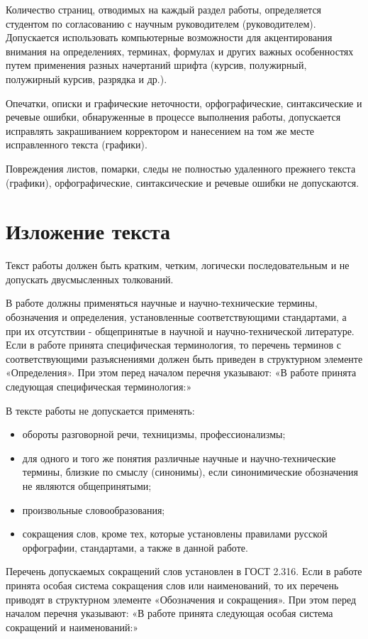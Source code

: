 \documentclass[14pt]{extreport}
\begin{document}
Количество страниц, отводимых на каждый раздел работы, определяется студентом по
согласованию с научным руководителем (руководителем). 
Допускается использовать компьютерные возможности для акцентирования внимания на
определениях, терминах, формулах и других важных особенностях путем применения
разных начертаний шрифта (курсив, полужирный, полужирный курсив, разрядка и
др.).  

Опечатки, описки и графические неточности, орфографические,
синтаксические и речевые ошибки, обнаруженные в процессе выполнения работы,
допускается исправлять закрашиванием корректором и нанесением на том же месте
исправленного текста (графики).

Повреждения листов, помарки, следы не полностью удаленного прежнего текста
(графики), орфографические, синтаксические и речевые ошибки не допускаются.

\section{Изложение текста}

Текст работы должен быть кратким, четким, логически последовательным и не
допускать двусмысленных толкований.

В работе должны применяться научные и научно-технические термины,
обозначения и определения, установленные соответствующими стандартами, а при их
отсутствии - общепринятые в научной и научно-технической литературе.
Если в работе принята специфическая терминология, то перечень терминов с
соответствующими разъяснениями должен быть приведен в структурном элементе
«Определения». При этом перед началом перечня указывают: «В работе принята
следующая специфическая терминология:»

В тексте работы не допускается применять:
\begin{itemize}
\item обороты разговорной речи, техницизмы, профессионализмы;
\item для одного и того же понятия различные научные и научно-технические термины,
близкие по смыслу (синонимы), если синонимические обозначения не являются
общепринятыми;
\item произвольные словообразования;
\item сокращения слов, кроме тех, которые установлены правилами русской орфографии,
стандартами, а также в данной работе.
\end{itemize}

Перечень допускаемых сокращений слов установлен в ГОСТ 2.316.
Если в работе принята особая система сокращения слов или наименований, то их
перечень приводят в структурном элементе «Обозначения и сокращения». При этом
перед началом перечня указывают: «В работе принята следующая особая система
сокращений и наименований:»
\end{document}
